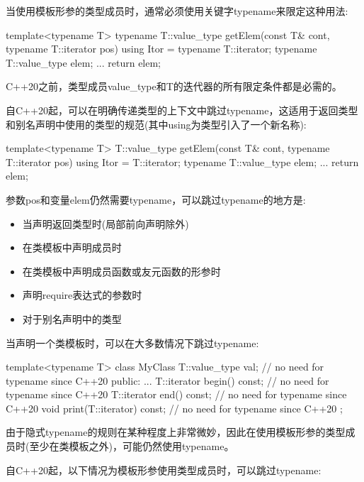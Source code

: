 
当使用模板形参的类型成员时，通常必须使用关键字typename来限定这种用法:

\begin{cpp}
template<typename T>
typename T::value_type getElem(const T& cont, typename T::iterator pos)
{
	using Itor = typename T::iterator;
	typename T::value_type elem;
	...
	return elem;
}
\end{cpp}

C++20之前，类型成员value\_type和T的迭代器的所有限定条件都是必需的。

自C++20起，可以在明确传递类型的上下文中跳过typename，这适用于返回类型和别名声明中使用的类型的规范(其中using为类型引入了一个新名称):

\begin{cpp}
template<typename T>
T::value_type getElem(const T& cont, typename T::iterator pos)
{
	using Itor = T::iterator;
	typename T::value_type elem;
	...
	return elem;
}
\end{cpp}

参数pos和变量elem仍然需要typename，可以跳过typename的地方是:

\begin{itemize}
\item
当声明返回类型时(局部前向声明除外)

\item
在类模板中声明成员时

\item
在类模板中声明成员函数或友元函数的形参时

\item
声明require表达式的参数时

\item
对于别名声明中的类型
\end{itemize}

当声明一个类模板时，可以在大多数情况下跳过typename:

\begin{cpp}
template<typename T>
class MyClass {
	T::value_type val; // no need for typename since C++20
public:
	...
	T::iterator begin() const; // no need for typename since C++20
	T::iterator end() const; // no need for typename since C++20
	void print(T::iterator) const; // no need for typename since C++20
};
\end{cpp}

由于隐式typename的规则在某种程度上非常微妙，因此在使用模板形参的类型成员时(至少在类模板之外)，可能仍然使用typename。


自C++20起，以下情况为模板形参使用类型成员时，可以跳过typename:

